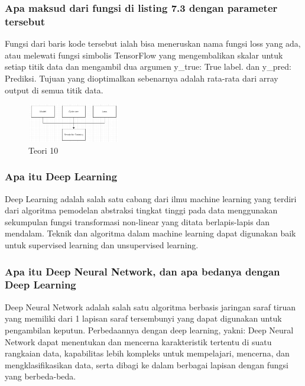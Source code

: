 \subsubsection{Apa maksud dari fungsi di listing 7.3 dengan parameter tersebut}
\hfill\break

Fungsi dari baris kode tersebut ialah bisa meneruskan nama fungsi loss yang ada, atau melewati fungsi simbolis TensorFlow yang mengembalikan skalar untuk setiap titik data dan mengambil dua argumen y\_true: True label. dan  y\_pred: Prediksi. Tujuan yang dioptimalkan sebenarnya adalah rata-rata dari array output di semua titik data.
\begin{figure}[H]
\centering
	\includegraphics[width=4cm]{figures/1174067/7/10.jpg}
\caption{Teori 10}
\end{figure}

\subsubsection{Apa itu Deep Learning}
\hfill\break
Deep Learning adalah salah satu cabang dari ilmu machine learning yang terdiri dari algoritma pemodelan abstraksi tingkat tinggi pada data menggunakan sekumpulan fungsi transformasi non-linear yang ditata berlapis-lapis dan mendalam. Teknik dan algoritma dalam machine learning dapat digunakan baik untuk supervised learning dan unsupervised learning.

\subsubsection{Apa itu Deep Neural Network, dan apa bedanya dengan Deep Learning}
\hfill\break
Deep Neural Network adalah salah satu algoritma berbasis jaringan saraf tiruan yang memiliki dari 1 lapisan saraf tersembunyi yang dapat digunakan untuk pengambilan keputun. Perbedaannya dengan deep learning, yakni: Deep Neural Network dapat menentukan dan mencerna karakteristik tertentu di suatu rangkaian data, kapabilitas lebih kompleks untuk mempelajari, mencerna, dan mengklasifikasikan data, serta dibagi ke dalam berbagai lapisan dengan fungsi yang berbeda-beda.

